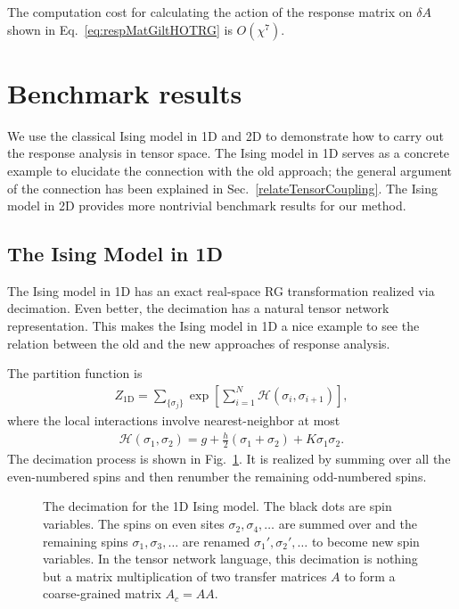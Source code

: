 \documentclass[aps,prb,reprint,superscriptaddress]{revtex4-2}
\begin{document}
The computation cost for calculating the action of the response matrix
on $\delta A$ shown in Eq.~\eqref{eq:respMatGiltHOTRG} is $O(\chi^7)$.

\section{Benchmark results\label{benchmark}}
We use the classical Ising model in 1D and 2D to demonstrate how to carry out
the response analysis in tensor space. The Ising model in 1D serves as a
concrete example to elucidate the connection with the old approach; the
general argument of the connection has been explained in
Sec.~\ref{relateTensorCoupling}. The Ising model in 2D provides more
nontrivial benchmark results for our method.
%

\subsection{The Ising Model in 1D\label{benchmark:1DIsing}}
The Ising model in 1D has an exact real-space RG transformation realized via
decimation. Even better, the decimation has a natural tensor
network representation. This makes the Ising model in 1D a nice example to see
the relation between the old and the new approaches of response
analysis.
%

The partition function is
%
\begin{align}\label{def:Z4Ising1D}
    Z_{\text{1D}} = \sum_{\{\sigma_j \} } \exp{\left[\sum_{i=1}^N
    \mathscr{H}\left(\sigma_i,\sigma_{i+1}\right)  \right]},
\end{align}
%
where the local interactions involve nearest-neighbor at most
%
\begin{align}\label{def:H4Ising1D}
    \mathscr{H}\left(\sigma_1, \sigma_2\right) = g +
    \frac{h}{2}\left(\sigma_1 + \sigma_2\right) + K\sigma_1 \sigma_2.
\end{align}
%
The decimation process is shown in Fig.~\ref{fig:Ising1D-decimation}.
It is realized by summing over all the even-numbered spins and then
renumber the remaining odd-numbered spins. 
%
\begin{figure}[h]
    \caption{\label{fig:Ising1D-decimation}The decimation for the 1D
    Ising model. The black dots are spin variables. The spins on even
sites $\sigma_2,\sigma_4,\ldots$ are summed over and the remaining spins
$\sigma_1,\sigma_3,\ldots$ are renamed $\sigma_1',\sigma_2',\ldots$ to
become new spin variables. In the tensor network language, this
decimation is nothing but a matrix multiplication of two transfer matrices
$A$ to form a coarse-grained matrix $A_c = AA$.}
\end{figure}
%
\end{document}
